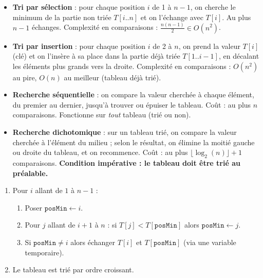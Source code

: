 \documentclass[11pt]{article}
\newcommand{\cle}[1]{{\popxbold\color{popdark}#1}}
\begin{document}
\begin{aretenir}
\begin{itemize}
\item \textbf{Tri par sélection} : pour chaque position $i$ de 1 à $n-1$, on cherche le \cle{minimum} de la partie non triée $T[i..n]$ et on l'échange avec $T[i]$. Au plus $n-1$ échanges. Complexité en comparaisons : $\frac{n(n-1)}{2} \in O(n^2)$.
\item \textbf{Tri par insertion} : pour chaque position $i$ de 2 à $n$, on prend la valeur $T[i]$ (clé) et on l'\cle{insère} à sa place dans la partie déjà triée $T[1..i-1]$, en décalant les éléments plus grands vers la droite. Complexité en comparaisons : $O(n^2)$ au pire, $O(n)$ au meilleur (tableau déjà trié).
\item \textbf{Recherche séquentielle} : on compare la valeur cherchée à chaque élément, du premier au dernier, jusqu'à trouver ou épuiser le tableau. Coût : au plus $n$ comparaisons. Fonctionne sur \emph{tout} tableau (trié ou non).
\item \textbf{Recherche dichotomique} : sur un tableau \cle{trié}, on compare la valeur cherchée à l'élément du \cle{milieu} ; selon le résultat, on élimine la moitié gauche ou droite du tableau, et on recommence. Coût : au plus $\lfloor \log_2(n) \rfloor + 1$ comparaisons. \textbf{Condition impérative : le tableau doit être trié au préalable.}
\end{itemize}
\end{aretenir}

\begin{methode}
\begin{enumerate}
\item Pour $i$ allant de $1$ à $n-1$ :
      \begin{enumerate}
      \item Poser $\texttt{posMin} \leftarrow i$.
      \item Pour $j$ allant de $i+1$ à $n$ : si $T[j] < T[\texttt{posMin}]$ alors $\texttt{posMin} \leftarrow j$.
      \item Si $\texttt{posMin} \neq i$ alors échanger $T[i]$ et $T[\texttt{posMin}]$ (via une variable temporaire).
      \end{enumerate}
\item Le tableau est trié par ordre croissant.
\end{enumerate}
\end{methode}
\end{document}
